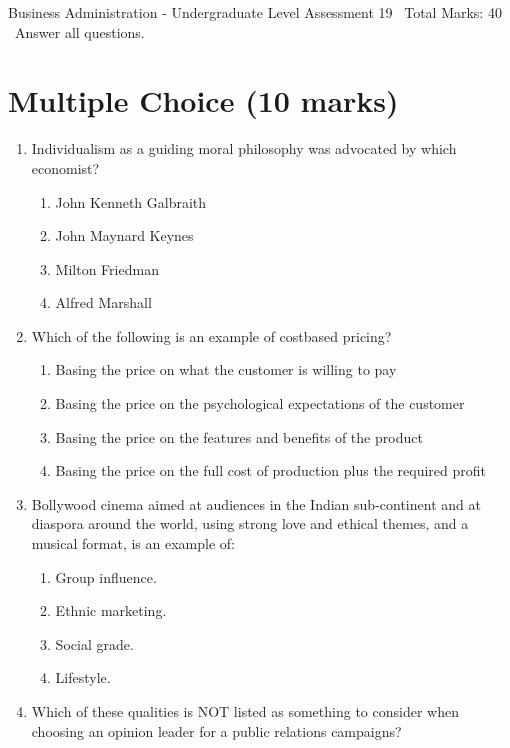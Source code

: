 \documentclass[12pt]{article}
\begin{document}
\begin{center}
Business Administration - Undergraduate Level Assessment 19 \
Total Marks: 40 \
Answer all questions.
\end{center}

\section*{Multiple Choice (10 marks)}
\begin{enumerate}[label=\arabic*.]
\item Individualism as a guiding moral philosophy was advocated by which economist?
\begin{enumerate}[label=(\alph*)]
    \item John Kenneth Galbraith
    \item John Maynard Keynes
    \item Milton Friedman
    \item Alfred Marshall
\end{enumerate}
\item Which of the following is an example of costbased pricing?
\begin{enumerate}[label=(\alph*)]
    \item Basing the price on what the customer is willing to pay
    \item Basing the price on the psychological expectations of the customer
    \item Basing the price on the features and benefits of the product
    \item Basing the price on the full cost of production plus the required profit
\end{enumerate}
\item Bollywood cinema aimed at audiences in the Indian sub-continent and at diaspora around the world, using strong love and ethical themes, and a musical format, is an example of:
\begin{enumerate}[label=(\alph*)]
    \item Group influence.
    \item Ethnic marketing.
    \item Social grade.
    \item Lifestyle.
\end{enumerate}
\item Which of these qualities is NOT listed as something to consider when choosing an opinion leader for a public relations campaigns?
\begin{enumerate}[label=(\alph*)]

\end{enumerate}
\end{enumerate}
\end{document}

